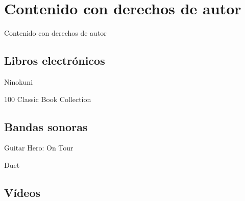 
\section[Contenido con copyright]{Contenido con derechos de autor}
\begin{frame}{Contenido con derechos de autor}

\end{frame}

\subsection{Libros electrónicos}
\begin{frame}{Ninokuni}

\end{frame}

\begin{frame}{100 Classic Book Collection}

\end{frame}

\subsection{Bandas sonoras}
\begin{frame}{Guitar Hero: On Tour}

\end{frame}

\begin{frame}{Duet}

\end{frame}

\subsection{Vídeos}
\begin{frame}
\end{frame}
